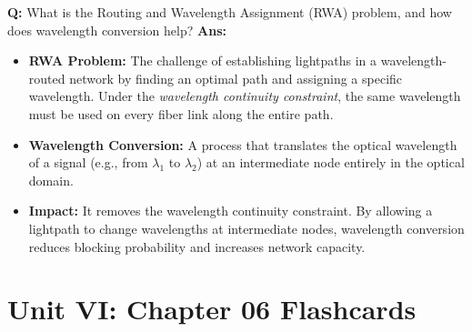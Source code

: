 \documentclass[10pt,a4paper,twocolumn]{article}
\begin{document}
\begin{tcolorbox}[
  colback=white,
  colframe=UnitColorFive,
  colbacktitle=gray!10!white,
  coltitle=black,
  fonttitle=\bfseries\sffamily\small,
  title={Unit V $\bullet$ Card 9: RWA Problem \& Wavelength Conversion},
  boxrule=1.2pt,
  arc=2mm,
  outer arc=2mm,
  boxsep=1.5mm,
  top=1mm,
  bottom=1mm,
  left=1.5mm,
  right=1.5mm,
  before skip=2.5mm,
  after skip=2.5mm
]
\textbf{Q:} What is the Routing and Wavelength Assignment (RWA) problem, and how does wavelength conversion help?
\tcbline
\textbf{Ans:} \begin{itemize}
  \item   \textbf{RWA Problem:} The challenge of establishing lightpaths in a wavelength-routed network by finding an optimal path and assigning a specific wavelength. Under the \textit{wavelength continuity constraint}, the same wavelength must be used on every fiber link along the entire path.
  \item   \textbf{Wavelength Conversion:} A process that translates the optical wavelength of a signal (e.g., from $\lambda_1$ to $\lambda_2$) at an intermediate node entirely in the optical domain.
  \item   \textbf{Impact:} It removes the wavelength continuity constraint. By allowing a lightpath to change wavelengths at intermediate nodes, wavelength conversion reduces blocking probability and increases network capacity.
\end{itemize}
\end{tcolorbox}

\section*{Unit VI: Chapter 06 Flashcards}
\end{document}
